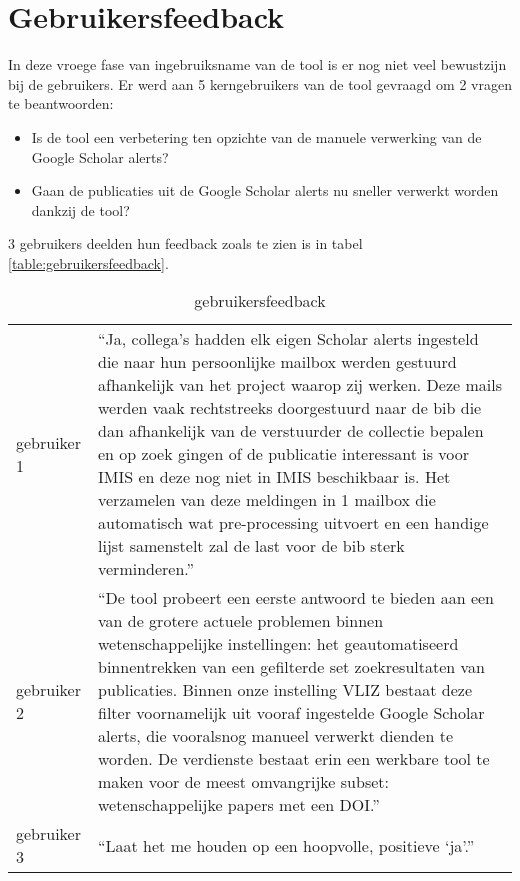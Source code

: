 \section{Gebruikersfeedback}
In deze vroege fase van ingebruiksname van de tool is er nog niet veel bewustzijn bij de gebruikers.
Er werd aan 5 kerngebruikers van de tool gevraagd om 2 vragen te beantwoorden:
\begin{itemize}
    \item Is de tool een verbetering ten opzichte van de manuele verwerking van de Google Scholar alerts?
    \item Gaan de publicaties uit de Google Scholar alerts nu sneller verwerkt worden dankzij de tool?
\end{itemize}
3 gebruikers deelden hun feedback zoals te zien is in tabel \ref{table:gebruikersfeedback}.
\begin{table}[h!]
    \tiny
    \caption{gebruikersfeedback}
    \centering
    \begin{tabularx}{\textwidth}{|p{2cm}|X|} 
        \hline
        \rowcolor{lightgray}
        \multicolumn{2}{|X|}{\textbf{Is de tool een verbetering ten opzichte van de manuele verwerking van de Google Scholar alerts?}} \\
        \hline
        gebruiker 1 &\enquote{Ja, collega's hadden elk eigen Scholar alerts ingesteld die naar hun persoonlijke mailbox werden gestuurd afhankelijk van het project waarop zij werken. Deze mails werden vaak rechtstreeks doorgestuurd naar de bib die dan afhankelijk van de verstuurder de collectie bepalen en op zoek gingen of de publicatie interessant is voor IMIS en deze nog niet in IMIS beschikbaar is.
        Het verzamelen van deze meldingen in 1 mailbox die automatisch wat pre-processing uitvoert en een handige lijst samenstelt zal de last voor de bib sterk verminderen.}\\
        gebruiker 2&\enquote{De tool probeert een eerste antwoord te bieden aan een van de grotere actuele problemen binnen wetenschappelijke instellingen: het geautomatiseerd binnentrekken van een gefilterde set zoekresultaten van publicaties. Binnen onze instelling VLIZ bestaat deze filter voornamelijk uit vooraf ingestelde Google Scholar alerts, die vooralsnog manueel verwerkt dienden te worden. De verdienste bestaat erin een werkbare tool te maken voor de meest omvangrijke subset: wetenschappelijke papers met een DOI.}\\
        gebruiker 3&\enquote{Laat het me houden op een hoopvolle, positieve ‘ja’.}\\

\end{tabularx}
\end{table}
